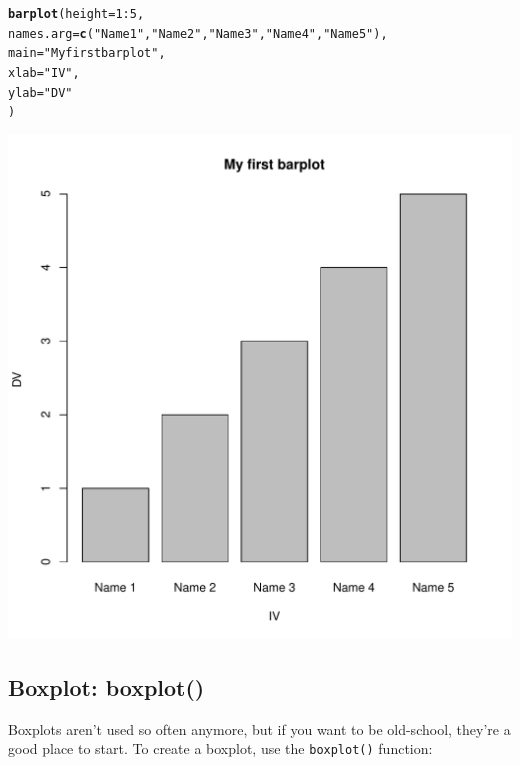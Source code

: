 \documentclass{tufte-book}\usepackage[]{graphicx}\usepackage[]{color}
\makeatletter
\def\maxwidth{ %
  \ifdim\Gin@nat@width>\linewidth
    \linewidth
  \else
    \Gin@nat@width
  \fi
}
\newcommand{\hlnum}[1]{\textcolor[rgb]{0.686,0.059,0.569}{#1}}%
\newcommand{\hlstr}[1]{\textcolor[rgb]{0.192,0.494,0.8}{#1}}%
\newcommand{\hlopt}[1]{\textcolor[rgb]{0,0,0}{#1}}%
\newcommand{\hlstd}[1]{\textcolor[rgb]{0.345,0.345,0.345}{#1}}%
\newcommand{\hlkwc}[1]{\textcolor[rgb]{0.333,0.667,0.333}{#1}}%
\newcommand{\hlkwd}[1]{\textcolor[rgb]{0.737,0.353,0.396}{\textbf{#1}}}%
\newenvironment{kframe}{%
 \def\at@end@of@kframe{}%
 \ifinner\ifhmode%
  \def\at@end@of@kframe{\end{minipage}}%
  \begin{minipage}{\columnwidth}%
 \fi\fi%
 \def\FrameCommand##1{\hskip\@totalleftmargin \hskip-\fboxsep
 \colorbox{shadecolor}{##1}\hskip-\fboxsep
     \hskip-\linewidth \hskip-\@totalleftmargin \hskip\columnwidth}%
 \MakeFramed {\advance\hsize-\width
   \@totalleftmargin\z@ \linewidth\hsize
   \@setminipage}}%
 {\par\unskip\endMakeFramed%
 \at@end@of@kframe}
\newenvironment{knitrout}{}{} %
\makeatother
\begin{document}
\begin{knitrout}
\color{fgcolor}\begin{kframe}
\begin{alltt}
\hlkwd{barplot}\hlstd{(}\hlkwc{height} \hlstd{=} \hlnum{1}\hlopt{:}\hlnum{5}\hlstd{,}
        \hlkwc{names.arg} \hlstd{=} \hlkwd{c}\hlstd{(}\hlstr{"Name 1"}\hlstd{,} \hlstr{"Name 2"}\hlstd{,} \hlstr{"Name 3"}\hlstd{,} \hlstr{"Name 4"}\hlstd{,} \hlstr{"Name 5"}\hlstd{),}
        \hlkwc{main} \hlstd{=} \hlstr{"My first barplot"}\hlstd{,}
        \hlkwc{xlab} \hlstd{=} \hlstr{"IV"}\hlstd{,}
        \hlkwc{ylab} \hlstd{=} \hlstr{"DV"}
        \hlstd{)}
\end{alltt}
\end{kframe}
\includegraphics[width=\maxwidth]{figure/unnamed-chunk-201-1} 

\end{knitrout}


\subsection{Boxplot: boxplot()}

Boxplots aren't used so often anymore, but if you want to be old-school, they're a good place to start. To create a boxplot, use the \texttt{boxplot()} function:
\end{document}
